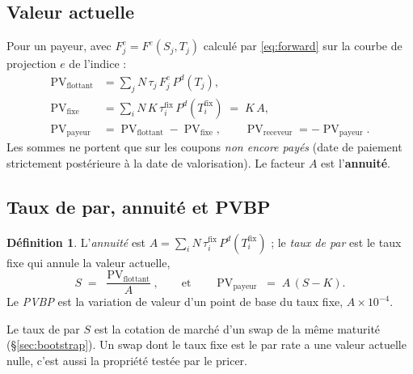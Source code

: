 \documentclass[11pt,a4paper]{article}
\DeclareMathOperator{\PV}{PV}
\theoremstyle{plain}
\theoremstyle{definition}
\newtheorem{definition}{Définition}
\theoremstyle{remark}
\begin{document}
\subsection{Valeur actuelle}
Pour un payeur, avec \(F^e_j = F^e(S_j,T_j)\) calculé par \eqref{eq:forward} sur la courbe de
projection \(e\) de l'indice :
\begin{align}
  \PV_{\mathrm{flottant}} &= \sum_{j} N\,\tau_j\,F^e_j\,P^d(T_j), \label{eq:floatpv}\\
  \PV_{\mathrm{fixe}}     &= \sum_{i} N\,K\,\tau^{\mathrm{fix}}_i\,P^d(T^{\mathrm{fix}}_i) \;=\; K\,A,
  \label{eq:fixedpv}\\
  \PV_{\mathrm{payeur}}   &= \PV_{\mathrm{flottant}} - \PV_{\mathrm{fixe}}, \qquad
  \PV_{\mathrm{receveur}} = -\PV_{\mathrm{payeur}}. \label{eq:pv}
\end{align}
Les sommes ne portent que sur les coupons \emph{non encore payés} (date de paiement strictement
postérieure à la date de valorisation). Le facteur \(A\) est l'\textbf{annuité}.

\subsection{Taux de par, annuité et PVBP}
\begin{definition}
L'\emph{annuité} est \(A=\sum_i N\,\tau_i^{\mathrm{fix}}\,P^d(T_i^{\mathrm{fix}})\) ; le \emph{taux de par}
est le taux fixe qui annule la valeur actuelle,
\begin{equation}
  S \;=\; \frac{\PV_{\mathrm{flottant}}}{A},
  \qquad\text{et}\qquad
  \PV_{\mathrm{payeur}} \;=\; A\,(S-K).
  \label{eq:par}
\end{equation}
Le \emph{PVBP} est la variation de valeur d'un point de base du taux fixe, \(A\times10^{-4}\).
\end{definition}
Le taux de par \(S\) est la cotation de marché d'un swap de la même maturité (\S\ref{sec:bootstrap}).
Un swap dont le taux fixe est le par rate a une valeur actuelle nulle, c'est aussi la propriété testée
par le pricer.
\end{document}
